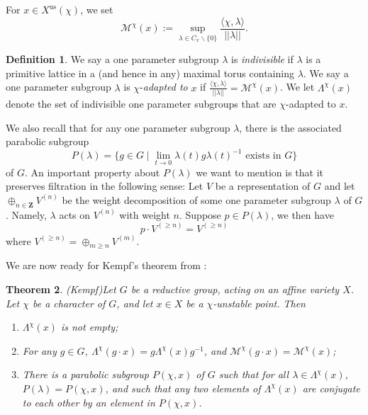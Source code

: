 \documentclass[a4paper]{amsart}
\numberwithin{equation}{section}
\theoremstyle{plain}
\newtheorem{theorem}{Theorem}[section]
\theoremstyle{definition}
\newtheorem{definition}[theorem]{Definition}
\begin{document}
For $x\in X^{\text{us}}(\chi)$, we set $$\mathcal{M}^{\chi}(x):=
  \sup_{\lambda\in C_{x}\backslash\{0\}}\frac{\langle\chi,\lambda\rangle
}{||\lambda||}.$$ 
\begin{definition}\label{worst_one_PS_def} 
We say a one parameter subgroup $\lambda $ is \emph{indivisible} if $\lambda$ is a primitive lattice in a (and hence in any)  maximal torus  containing $\lambda$. 
We say a one parameter subgroup $\lambda$ is $\chi$-\emph{adapted to }$x$ if
$\frac{\langle\chi,\lambda\rangle}{||\lambda||}= \mathcal{M}^{\chi}(x)$. We let $\Lambda^{\chi}(x)$ denote the set of indivisible one parameter subgroups that are $\chi$-adapted to $x$.
\end{definition}

We also recall that for any one parameter subgroup $\lambda$, there is the associated parabolic subgroup $$P(\lambda)=\{g\in G\mid \lim_{t\rightarrow 0}\lambda(t)g\lambda(t)^{-1}\text{ exists in }G\}$$ of $G$. An important property about $P(\lambda)$ we want to mention is that it preserves filtration in the following sense: Let $V$ be a representation of $G$ and let $\oplus_{n\in\mathbf{Z}}V^{(n)}$ be the weight decomposition of some one parameter subgroup $\lambda$ of $G$. Namely, $\lambda$ acts on $V^{(n)}$ with weight $n$. Suppose $p\in P(\lambda)$, we then have $$p\cdot V^{(\geq n)}=V^{(\geq n)}$$ where $V^{(\geq n)}=\oplus_{m\geq n}V^{(m)}$. 

We are now ready for Kempf's theorem from \cite{MR506989}:
\begin{theorem}(Kempf)\label{theorem6}
Let $G$ be a reductive group, acting on an affine variety $X$. Let $\chi$ be a character of $G$, and let 
$x\in X$ be a $\chi$-unstable point. Then
\begin{enumerate}
\item $\Lambda^{\chi}(x)$ is not empty;
\item For any $g\in G$, $\Lambda^{\chi}(g\cdot x)=g\Lambda^{\chi}(x) g^{-1}$, and $\mathcal{M}^{\chi}(g\cdot x)=\mathcal{M}^{\chi}(x)$;
\item There is a
  parabolic subgroup $P(\chi,x)$ of $G$ such that for all $\lambda\in \Lambda^{\chi}(x)$, $P(\lambda)= P(\chi,x)$, and such that any two elements of $\Lambda^{\chi}(x)$ are conjugate to each other by an element in $P(\chi,x)$. 
\end{enumerate}
\end{theorem}
\end{document}
